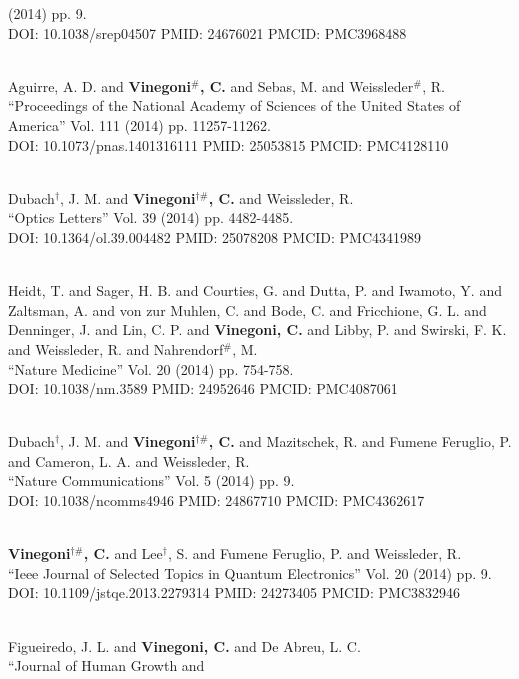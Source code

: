 (2014) pp. 9. \\ DOI: 10.1038/srep04507 PMID: 24676021 PMCID: PMC3968488\item {} \\ Aguirre, A. D. and {\bf Vinegoni$^\#$, C.} and Sebas, M. and Weissleder$^\#$, R. \\ ``Proceedings of the National Academy of Sciences of the United States of America'' Vol. 111 (2014) pp. 11257-11262. \\ DOI: 10.1073/pnas.1401316111 PMID: 25053815 PMCID: PMC4128110\item {} \\ Dubach$^\dag$, J. M. and {\bf Vinegoni$^{\dag \#}$, C.} and Weissleder, R. \\ ``Optics Letters'' Vol. 39 (2014) pp. 4482-4485. \\ DOI: 10.1364/ol.39.004482 PMID: 25078208 PMCID: PMC4341989\item {} \\ Heidt, T. and Sager, H. B. and Courties, G. and Dutta, P. and Iwamoto, Y. and Zaltsman, A. and von zur Muhlen, C. and Bode, C. and Fricchione, G. L. and Denninger, J. and Lin, C. P. and {\bf Vinegoni, C.} and Libby, P. and Swirski, F. K. and Weissleder, R. and Nahrendorf$^\#$, M. \\ ``Nature Medicine'' Vol. 20 (2014) pp. 754-758. \\ DOI: 10.1038/nm.3589 PMID: 24952646 PMCID: PMC4087061\item {} \\ Dubach$^\dag$, J. M. and {\bf Vinegoni$^{\dag \#}$, C.} and Mazitschek, R. and Fumene Feruglio, P. and Cameron, L. A. and Weissleder, R. \\ ``Nature Communications'' Vol. 5 (2014) pp. 9. \\ DOI: 10.1038/ncomms4946 PMID: 24867710 PMCID: PMC4362617\item {} \\ {\bf Vinegoni$^{\dag \#}$, C.} and Lee$^\dag$, S. and Fumene Feruglio, P. and Weissleder, R. \\ ``Ieee Journal of Selected Topics in Quantum Electronics'' Vol. 20 (2014) pp. 9. \\ DOI: 10.1109/jstqe.2013.2279314 PMID: 24273405 PMCID: PMC3832946\item {} \\ Figueiredo, J. L. and {\bf Vinegoni, C.} and De Abreu, L. C. \\ ``Journal of Human Growth and 